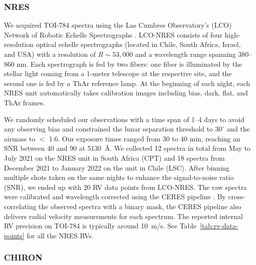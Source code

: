 \documentclass[twocolumn]{aastex631}
\begin{document}
\subsubsection{NRES}
\label{sec:NRES}

We acquired TOI-784 spectra using the Las Cumbres Observatory's (LCO) Network of Robotic Echelle Spectrographs \citep[NRES;][]{Siverd2018}. LCO-NRES consists of four high-resolution optical echelle spectrographs (located in Chile, South Africa, Israel, and USA) with a resolution of $R \sim 53,000$ and a wavelength range spanning 380--860 nm. Each spectrograph is fed by two fibers: one fiber is illuminated by the stellar light coming from a 1-meter telescope at the respective site, and the second one is fed by a ThAr reference lamp. At the beginning of each night, each NRES unit automatically takes calibration images including bias, dark, flat, and ThAr frames. 

We randomly scheduled our observations with a time span of 1--4 days to avoid any observing bias \citep[][]{Burt2018} and constrained the lunar separation threshold to $30^{\circ}$ and the airmass to $<$ 1.6. Our exposure times ranged from 30 to 40 min, reaching an SNR between 40 and 90 at 5130~\AA. We collected 12 spectra in total from May to July 2021 on the NRES unit in South Africa (CPT) and 18 spectra from December 2021 to January 2022 on the unit in Chile (LSC). After binning multiple shots taken on the same nights to enhance the signal-to-noise ratio (SNR), we ended up with 20 RV data points from LCO-NRES. The raw spectra were calibrated and wavelength corrected using the CERES pipeline \citep{Brahm2017}. By cross-correlating the observed spectra with a binary mask, the CERES pipeline also delivers radial velocity measurements for each spectrum. The reported internal RV precision on TOI-784 is typically around 10~m/s. See Table~\ref{tab:rv-data-points} for all the NRES RVs. 


\subsubsection{CHIRON}
\label{sec:CHIRON}
\end{document}

